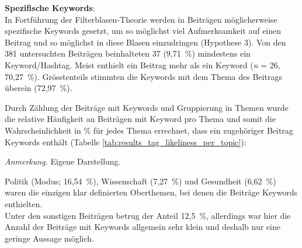 \documentclass[12pt,a4paper]{article}        %
\begin{document}
\textbf{Spezifische Keywords}: \\
In Fortführung der Filterblasen-Theorie \parencites[vgl.\ bspw.][8]{zoglauer_konstruierte_2021}[222]{schmidt_meinungsbildung_2022}[195]{krafft_disinformation_2020}[8]{grujic_warnhinweise_2024}[221]{allcott_social_2017} werden in Beiträgen möglicherweise spezifische Keywords gesetzt, um so möglichst viel Aufmerksamkeit auf einen Beitrag und so möglichst in diese Blasen einzudringen (Hypothese 3). 
Von den 381 untersuchten Beiträgen beinhalteten 37 (9,71 \%) mindestens ein Keyword/Hashtag. Meist enthielt ein Beitrag mehr als ein Keyword (\textit{n} = 26, 70,27 \%). Grösstenteils stimmten die Keywords mit dem Thema des Beitrags überein (72,97 \%).

Durch Zählung der Beiträge mit Keywords und Gruppierung in Themen wurde die relative Häufigkeit an Beiträgen mit Keyword pro Thema und somit die Wahrscheinlichkeit in \% für jedes Thema errechnet, dass ein zugehöriger Beitrag Keywords enthält (Tabelle \ref{tab:results_tag_likeliness_per_topic}):
\begin{table}[H]
  \caption{\textit{Relative Häufigkeit der Beiträge mit Keyword pro Themengebiet}}
  \label{tab:results_tag_likeliness_per_topic}
  \centering
  \footnotesize\textit{Anmerkung.} Eigene Darstellung.
\end{table}
Politik (Modus; 16,54 \%), Wissenschaft (7,27 \%) und Gesundheit (6,62 \%) waren die einzigen klar definierten Oberthemen, bei denen die Beiträge Keywords enthielten. \\
Unter den sonstigen Beiträgen betrug der Anteil 12,5 \%, allerdings war hier die Anzahl der Beiträge mit Keywords allgemein sehr klein und deshalb nur eine geringe Aussage möglich. 
\end{document}
